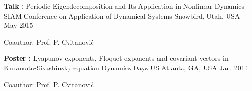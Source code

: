 


\begin{cventries}


\cventry
{\textbf{Talk :} Periodic Eigendecomposition and Its Application in Nonlinear Dynamics} %
{SIAM Conference on Application of Dynamical Systems} %
{Snowbird, Utah, USA} %
{May 2015} %
{ %
\begin{cvitems}
  \item {Coauthor: Prof. P. Cvitanović}
\end{cvitems}
}


\cventry
{\textbf{Poster :} Lyapunov exponents, Floquet exponents and covariant vectors in Kuramoto-Sivashinsky equation}
{Dynamics Days US} %
{Atlanta, GA, USA } %
{Jan. 2014} %
{ %
\begin{cvitems}
  \item {Coauthor: Prof. P. Cvitanović}
\end{cvitems}
}



\end{cventries}
